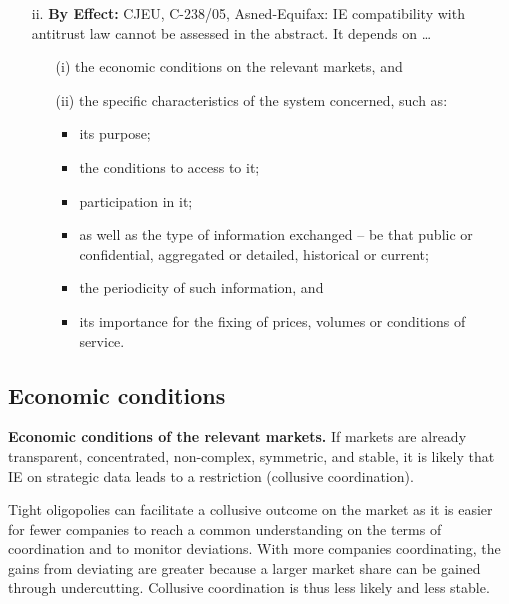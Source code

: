 \begin{enumerate}
\begin{enumerate}
                    \item[ii.] \textbf{By Effect:} CJEU, C-238/05, Asned-Equifax: IE compatibility with antitrust law cannot be assessed in the abstract. It depends on \dots
                    \begin{itemize}
                        \item[(i)] the economic conditions on the relevant markets, and
                        \item[(ii)] the specific characteristics of the system concerned, such as:
                        \begin{itemize}
                            \item its purpose;
                            \item the conditions to access to it;
                            \item participation in it;
                            \item as well as the type of information exchanged -- be that public or confidential, aggregated or detailed, historical or current;
                            \item the periodicity of such information, and
                            \item its importance for the fixing of prices, volumes or conditions of service.
                        \end{itemize}
                    \end{itemize}
                \end{enumerate}
        \end{enumerate}


    \subsection{Economic conditions}

        \textbf{Economic conditions of the relevant markets.} If markets are already transparent, concentrated, non-complex, symmetric, and stable, it is likely that IE on strategic data leads to a restriction (collusive coordination).  
        
        Tight oligopolies can facilitate a collusive outcome on the market as it is easier for fewer companies to reach a common understanding on the terms of coordination and to monitor deviations.   With more companies coordinating, the gains from deviating are greater because a larger market share can be gained through undercutting. Collusive coordination is thus less likely and less stable.  
        
